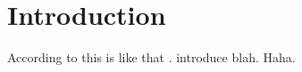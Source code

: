 \section{Introduction}
\label{sec:intro}

According to  this is like that \cite{Kdr2016RepresentationOL}.
 introduce blah. Haha.